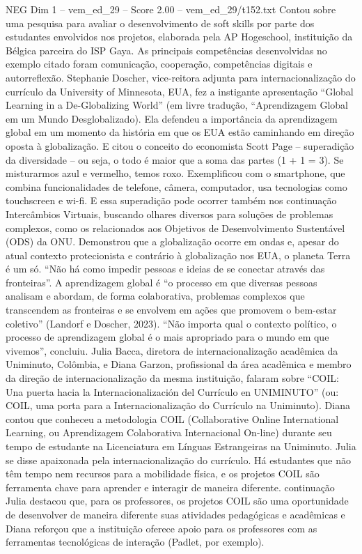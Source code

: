 \begin{textsample}{NEG Dim 1 – vem\_ed\_29 – Score 2.00 – vem\_ed\_29/t152.txt}
Contou sobre uma pesquisa para avaliar o desenvolvimento de soft skills por parte dos estudantes envolvidos nos projetos, elaborada pela AP Hogeschool, instituição da Bélgica parceira do ISP Gaya.
As principais competências desenvolvidas no exemplo citado foram comunicação, cooperação, competências digitais e autorreflexão.
Stephanie Doscher, vice-reitora adjunta para internacionalização do currículo da University of Minnesota, EUA, fez a instigante apresentação “Global Learning in a De-Globalizing World” (em livre tradução, “Aprendizagem Global em um Mundo Desglobalizado).
Ela defendeu a importância da aprendizagem global em um momento da história em que os EUA estão caminhando em direção oposta à globalização.
E citou o conceito do economista Scott Page – superadição da diversidade – ou seja, o todo é maior que a soma das partes (1 + 1 = 3).
Se misturarmos azul e vermelho, temos roxo.
Exemplificou com o smartphone, que combina funcionalidades de telefone, câmera, computador, usa tecnologias como touchscreen e wi-fi.
E essa superadição pode ocorrer também nos continuação Intercâmbios Virtuais, buscando olhares diversos para soluções de problemas complexos, como os relacionados aos Objetivos de Desenvolvimento Sustentável (ODS) da ONU.
Demonstrou que a globalização ocorre em ondas e, apesar do atual contexto protecionista e contrário à globalização nos EUA, o planeta Terra é um só. “Não há como impedir pessoas e ideias de se conectar através das fronteiras”.
A aprendizagem global é “o processo em que diversas pessoas analisam e abordam, de forma colaborativa, problemas complexos que transcendem as fronteiras e se envolvem em ações que promovem o bem-estar coletivo” (Landorf e Doscher, 2023). “Não importa qual o contexto político, o processo de aprendizagem global é o mais apropriado para o mundo em que vivemos”, concluiu.
Julia Bacca, diretora de internacionalização acadêmica da Uniminuto, Colômbia, e Diana Garzon, profissional da área acadêmica e membro da direção de internacionalização da mesma instituição, falaram sobre “COIL: Una puerta hacia la Internacionalización del Currículo en UNIMINUTO” (ou: COIL, uma porta para a Internacionalização do Currículo na Uniminuto).
Diana contou que conheceu a metodologia COIL (Collaborative Online International Learning, ou Aprendizagem Colaborativa Internacional On-line) durante seu tempo de estudante na Licenciatura em Línguas Estrangeiras na Uniminuto.
Julia se disse apaixonada pela internacionalização do currículo.
Há estudantes que não têm tempo nem recursos para a mobilidade física, e os projetos COIL são ferramenta chave para aprender e interagir de maneira diferente. continuação Julia destacou que, para os professores, os projetos COIL são uma oportunidade de desenvolver de maneira diferente suas atividades pedagógicas e acadêmicas e Diana reforçou que a instituição oferece apoio para os professores com as ferramentas tecnológicas de interação (Padlet, por exemplo).

\end{textsample}
